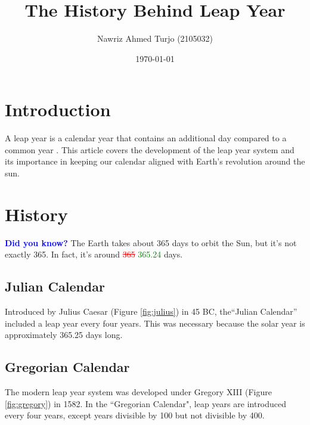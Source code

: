 \documentclass{article}
\title{The History Behind Leap Year}
\author{
    Nawriz Ahmed Turjo (2105032)
}
\date{\today}
\begin{document}
\maketitle

\section{Introduction}
A leap year is a calendar year that contains an additional day compared to a
common year \cite{meeus1991}. This article covers the development of the leap year system and
its importance in keeping our calendar aligned with Earth’s revolution around
the sun.
\section{History}
\textbf{\textcolor{blue}{Did you know?}} The Earth takes about 365 days to orbit the Sun, but it’s not
exactly 365. In fact, it’s around  \textcolor{red}{\st{365}} \textcolor{green}{365.24} days.
\subsection{Julian Calendar}
Introduced by Julius Caesar (Figure \ref{fig:julius}) in 45 BC, the``Julian Calendar'' included
a leap year every four years. This was necessary because the solar year
is approximately 365.25 days long.
\subsection{Gregorian Calendar}
The modern leap year system was developed under Gregory XIII (Figure \ref{fig:gregory}) in
1582. In the ``Gregorian Calendar", leap years are introduced every four years,
except years divisible by 100 but not divisible by 400.
\end{document}
